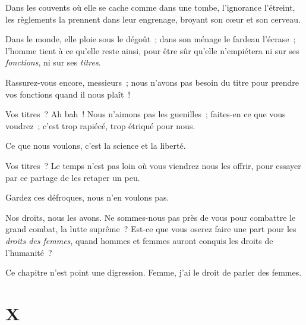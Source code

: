 \documentclass[french,twoside]{book} %
\newcommand\chapteropen{} %
\newcommand\chapterclose{} %
\begin{document}
Dans les couvents où elle se cache comme dans une tombe, l’ignorance l’étreint, les règlements la prennent dans leur engrenage, broyant son cœur et son cerveau.\par
Dans le monde, elle ploie sous le dégoût ; dans son ménage le fardeau l’écrase ; l’homme tient à ce qu’elle reste ainsi, pour être sûr qu’elle n’empiétera ni sur ses \emph{fonctions}, ni sur ses \emph{titres}.\par
Rassurez-vous encore, messieurs ; nous n’avons pas besoin du titre pour prendre vos fonctions quand il nous plaît !\par
Vos titres ? Ah bah ! Nous n’aimons pas les guenilles ; faites-en ce que vous voudrez ; c’est trop rapiécé, trop étriqué pour nous.\par
Ce que nous voulons, c’est la science et la liberté.\par
Vos titres ? Le temps n’est pas loin où vous viendrez nous les offrir, pour essayer par ce partage de les retaper un peu.\par
Gardez ces défroques, nous n’en voulons pas.\par
 Nos droits, nous les avons. Ne sommes-nous pas près de vous pour combattre le grand combat, la lutte suprême ? Est-ce que vous oserez faire une part pour les \emph{droits des femmes}, quand hommes et femmes auront conquis les droits de l’humanité ?\par
Ce chapitre n’est point une digression. Femme, j’ai le droit de parler des femmes.
\chapterclose


\chapteropen
 \chapter[{X}]{X}
\label{p1.10}
\end{document}
